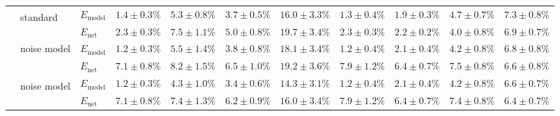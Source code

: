 \begin{sidewaystable}
\begin{tabular}{p{2.2cm} p{1.7cm} l r r r r r r r r }
	\\\cmidrule(l){2-11}
	&
	\multirow{2}{1.7cm}{\raggedleft %
	standard\textsuperscript{\dag}} &
	$E_\mathrm{model}$ & 
	\color{Gray}$1.4 \pm 0.3\%$ & \color{Gray}$5.3 \pm 0.8\%$ & \color{Gray}$3.7 \pm 0.5\%$ & \color{Gray}$16.0 \pm 3.3\%$ & \color{Gray}$1.3 \pm 0.4\%$ & \color{Gray}$1.9 \pm 0.3\%$ & \color{Gray}$4.7 \pm 0.7\%$ & \color{Gray}$7.3 \pm 0.8\%$
	\\
	& & 
	$E_\mathrm{net}$ &
	\cellcolor{White!100!SteelBlue}$\mathbf{2.3 \pm 0.3\%}$ & \cellcolor{White!94!SteelBlue}$7.5 \pm 1.1\%$ & \cellcolor{White!100!SteelBlue}$\mathbf{5.0 \pm 0.8\%}$ & \cellcolor{White!69!SteelBlue}$19.7 \pm 3.4\%$ & \cellcolor{White!100!SteelBlue}$\mathbf{2.3 \pm 0.3\%}$ & \cellcolor{White!100!SteelBlue}$\mathbf{2.2 \pm 0.2\%}$ & \cellcolor{White!100!SteelBlue}$\mathbf{4.0 \pm 0.8\%}$ & \cellcolor{White!88!SteelBlue}$6.9 \pm 0.7\%$
	\\\cmidrule(l){2-11}
	&
	\multirow{2}{1.7cm}{\raggedleft %
	noise model} &
	$E_\mathrm{model}$ & 
	\color{Gray}$1.2 \pm 0.3\%$ & \color{Gray}$5.5 \pm 1.4\%$ & \color{Gray}$3.8 \pm 0.8\%$ & \color{Gray}$18.1 \pm 3.4\%$ & \color{Gray}$1.2 \pm 0.4\%$ & \color{Gray}$2.1 \pm 0.4\%$ & \color{Gray}$4.2 \pm 0.8\%$ & \color{Gray}$6.8 \pm 0.8\%$
	\\
	& & 
	$E_\mathrm{net}$ &
	\cellcolor{White!50!SteelBlue}$7.1 \pm 0.8\%$ & \cellcolor{White!88!SteelBlue}$8.2 \pm 1.5\%$ & \cellcolor{White!82!SteelBlue}$6.5 \pm 1.0\%$ & \cellcolor{White!75!SteelBlue}$19.2 \pm 3.6\%$ & \cellcolor{White!50!SteelBlue}$7.9 \pm 1.2\%$ & \cellcolor{White!57!SteelBlue}$6.4 \pm 0.7\%$ & \cellcolor{White!69!SteelBlue}$7.5 \pm 0.8\%$ & \cellcolor{White!94!SteelBlue}$6.6 \pm 0.8\%$
	\\\cmidrule(l){2-11}
	&
	\multirow{2}{1.7cm}{\raggedleft %
	noise model\textsuperscript{\dag}} &
	$E_\mathrm{model}$ & 
	\color{Gray}$\mathbf{1.2 \pm 0.3\%}$ & \color{Gray}$4.3 \pm 1.0\%$ & \color{Gray}$3.4 \pm 0.6\%$ & \color{Gray}$14.3 \pm 3.1\%$ & \color{Gray}$1.2 \pm 0.4\%$ & \color{Gray}$2.1 \pm 0.4\%$ & \color{Gray}$\mathbf{4.2 \pm 0.8\%}$ & \color{Gray}$6.6 \pm 0.7\%$
	\\
	& & 
	$E_\mathrm{net}$ &
	\cellcolor{White!44!SteelBlue}$7.1 \pm 0.8\%$ & \cellcolor{White!100!SteelBlue}$\mathbf{7.4 \pm 1.3\%}$ & \cellcolor{White!88!SteelBlue}$6.2 \pm 0.9\%$ & \cellcolor{White!88!SteelBlue}$16.0 \pm 3.4\%$ & \cellcolor{White!44!SteelBlue}$7.9 \pm 1.2\%$ & \cellcolor{White!63!SteelBlue}$6.4 \pm 0.7\%$ & \cellcolor{White!75!SteelBlue}$7.4 \pm 0.8\%$ & \cellcolor{White!100!SteelBlue}$\mathbf{6.4 \pm 0.7\%}$

\end{tabular}
\end{sidewaystable}
